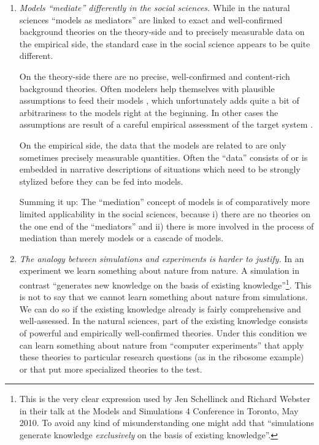 \documentclass[onecollarge]{STJour}
\numberwithin{equation}{section}
\begin{document}
\begin{enumerate}
  \item {\em Models ``mediate'' differently in the social sciences.}
  While in the natural sciences ``models as mediators'' are linked to exact and
  well-confirmed background theories on the theory-side and to precisely
  measurable data on the empirical side, the standard case in the social
  science appears to be quite different.
 
  On the theory-side there are no precise, well-confirmed and
  content-rich background theories. Often modelers help themselves with
  plausible assumptions to feed their models
  \citep{hegselmann-krause:2002}, which unfortunately adds quite a bit
  of arbitrariness to the models right at the beginning. 
  In other cases the assumptions are result of a careful
  empirical assessment of the target system \citep{siebers-et-al:2010}.

  On the empirical side, the data that the models are related to are
  only sometimes precisely measurable quantities. Often the ``data''
  consists of or is embedded in narrative descriptions of situations
  which need to be strongly stylized before they can be fed into models.
  
  Summing it up: The ``mediation'' concept of models is of
  comparatively more limited applicability in the social sciences,
  because i) there are no theories on the one end of the ``mediators''
  and ii) there is more involved in the process of mediation than merely
  models or a cascade of models. 

  \item {\em The analogy between simulations and experiments is harder
  to justify.} In an experiment we learn something about nature from nature.
  A simulation in contrast ``generates new knowledge on the basis of
  existing knowledge''\footnote{This is the very clear expression used by
  Jen Schellinck and Richard Webster in their talk at the Models and
  Simulations 4 Conference in Toronto, May 2010. To avoid any kind of
  misunderstanding one might add that ``simulations generate knowledge
  {\em exclusively} on the basis of existing knowledge''.}. This is not
  to say that we cannot learn something about nature from simulations. We
  can do so if the existing knowledge already is fairly comprehensive and
  well-assessed. In the natural sciences, part of the existing knowledge
  consists of powerful and empirically well-confirmed theories. Under
  this condition we can learn something about nature from ``computer
  experiments'' that apply these theories to particular research
  questions (as in the ribosome example) or that put more specialized
  theories to the test.
 

\end{enumerate}
\end{document}
